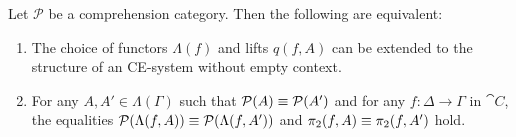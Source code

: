 \begin{comment}
\begin{defn}
Let $f_0\defeq f:\Delta\to\Gamma$ be a morphism of $\cat{C}$, the base category of a
split comprehension category $\mathcal{P}$ wich a choice $j$ of cartesian lifts.
By induction we define an element $\Lambda(f,A)\in\Lambda(\Delta)$ together with
a morphism $q(f,A):\mathrm{dom}(\mathcal{P}(\Lambda(f,A)))\to 
\mathrm{dom}(\mathcal{P}(A))$, for any $A\jdeq (A_1,\ldots,A_n) 
\in\Lambda(\Gamma)$.

For $n\jdeq 0$, i.e.~if $A$ is the empty sequence, we let $\Lambda(f,A)$ be the 
empty sequence, and $q(f,A) \jdeq f$. For the inductive step, consider a 
sequence $A_1,\ldots,A_{n+1}\in \Lambda(\Gamma)$. Then we define
\begin{align*}
\Lambda(f,A) & \jdeq \mathrm{dom}(j(A_{n+1},q(f,(A_1,\ldots,A_n))))
\intertext{and}
q(f,A) & \jdeq \mathrm{dom}(\mathcal{P}(j(A_{n+1},q(f,(A_1,\ldots,A_n)))))
\end{align*}
where we consider in the definition of $q(f,A)$, $\mathrm{dom}$ to be the 
domain functor from $\cat{C}^{\to}\to\cat{C}$. 
\end{defn}

\begin{rmk}
It follows immediately from the definition of comprehension categories and the
pasting lemma of pullbacks, that the square
\begin{equation*}
\begin{tikzcd}[column sep=large]
\mathrm{dom}(\mathcal{P}(\Lambda(f,A))) \arrow[r,"{q(f,A)}"] \arrow[d,swap,"{\mathcal{P}(\Lambda(f,A))}"] & \mathrm{dom}(\mathcal{P}(A)) \arrow[d,"{\mathcal{P}(A)}"] \\
\Delta \arrow[r,"f"] & \Gamma
\end{tikzcd}
\end{equation*}
is a pullback square.
\end{rmk}
\end{comment}

\begin{thm}
Let $\mathcal{P}$ be a comprehension category. Then the following are equivalent:
\begin{enumerate}
\item The choice of functors $\Lambda(f)$ and lifts $q(f,A)$ can be extended to the 
structure of an CE-system without empty context.
\item For any
$A,A'\in\Lambda(\Gamma)$ such that $\mathcal{P}(A)\equiv\mathcal{P}(A')$
and for any $f:\Delta\to\Gamma$ in $\cat{C}$, the equalities
$\mathcal{P}(\Lambda(f,A))\equiv\mathcal{P}(\Lambda(f,A'))$ and
$\pi_2(f,A)\equiv\pi_2(f,A')$ hold. 
\end{enumerate}
\end{thm}

